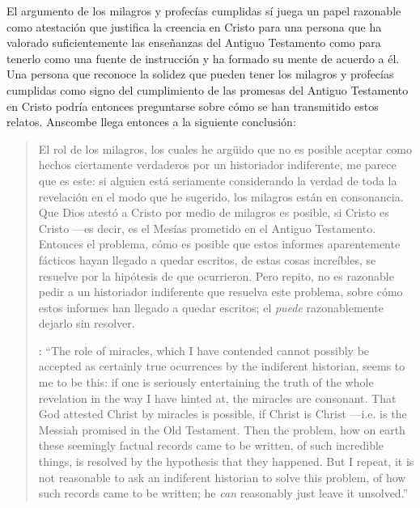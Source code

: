 El argumento de los milagros y profecías cumplidas sí juega un papel razonable como atestación que justifica la creencia en Cristo para una persona que ha valorado suficientemente las enseñanzas del Antiguo Testamento como para tenerlo como una fuente de instrucción y ha formado su mente de acuerdo a él. Una persona que reconoce la solidez que pueden tener los milagros y profecías cumplidas como signo del cumplimiento de las promesas del Antiguo Testamento en Cristo podría entonces preguntarse sobre cómo se han transmitido estos relatos. Anscombe llega entonces a la siguiente conclusión: \blockquote[{\cite[37]{anscombe2008faith:prophandmi}}: \enquote{The role of miracles, which I have contended cannot possibly be accepted as certainly true ocurrences by the indiferent historian, seems to me to be this: if one is seriously entertaining the truth of the whole revelation in the way I have hinted at, the miracles are consonant. That God attested Christ by miracles is possible, if Christ is Christ ---i.e. is the Messiah promised in the Old Testament. Then the problem, how on earth these seemingly factual records came to be written, of such incredible things, is resolved by the hypothesis that they happened. \textelp{} But I repeat, it is not reasonable to ask an indiferent historian to solve this problem, of how such records came to be written; he \emph{can} reasonably just leave it unsolved.}]{El rol de los milagros, los cuales he argüido que no es posible aceptar como hechos ciertamente verdaderos por un historiador indiferente, me parece que es este: si alguien está seriamente considerando la verdad de toda la revelación en el modo que he sugerido, los milagros están en consonancia. Que Dios atestó a Cristo por medio de milagros es posible, si Cristo es Cristo ---es decir, es el Mesías prometido en el Antiguo Testamento. Entonces el problema, cómo es posible que estos informes aparentemente fácticos hayan llegado a quedar escritos, de estas cosas increíbles, se resuelve por la hipótesis de que ocurrieron. \textelp{} Pero repito, no es razonable pedir a un historiador indiferente que resuelva este problema, sobre cómo estos informes han llegado a quedar escritos; el \emph{puede} razonablemente dejarlo sin resolver.}


